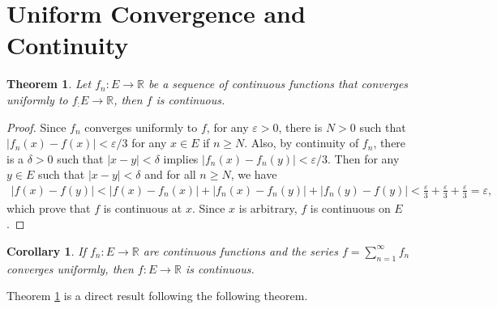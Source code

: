 \documentclass[11pt]{book}
\newtheorem{theorem}{Theorem}[chapter]
\newtheorem{corollary}{Corollary}[theorem]
\theoremstyle{definition}
\numberwithin{equation}{chapter}
\begin{document}
\medskip







\section{Uniform Convergence and Continuity}

\begin{theorem}\label{th_63}
Let $f_n: E \to \mathbb{R}$ be a sequence of continuous functions that converges uniformly to $f_: E \to \mathbb{R}$, then $f$ is continuous.
\end{theorem}
\begin{proof}
Since $f_n$ converges uniformly to $f$, for any $\varepsilon > 0$, there is $N > 0$ such that $\left|f_n(x) - f(x)\right| < \varepsilon/3$ for any $x \in E$ if $n \geq N$. Also, by continuity of $f_n$, there is a $\delta > 0$ such that $\left|x - y\right| < \delta$ implies $\left|f_n(x) - f_n(y)\right| < \varepsilon/3$. Then for any $y \in E$ such that $\left|x - y\right| < \delta$ and for all $n \geq N$, we have
\begin{align*}
    \left|f(x) - f(y)\right| < \left|f(x) - f_n(x)\right| + \left|f_n(x) - f_n(y)\right| + \left|f_n(y) - f(y)\right| < \frac{\varepsilon}{3} + \frac{\varepsilon}{3} + \frac{\varepsilon}{3} = \varepsilon,
\end{align*}
which prove that $f$ is continuous at $x$. Since $x$ is arbitrary, $f$ is continuous on $E$.
\end{proof}

\medskip


\begin{corollary}\label{coro_631}
If $f_n: E \to \mathbb{R}$ are continuous functions and the series $f = \sum^\infty_{n=1} f_n$ converges uniformly, then $f: E \to \mathbb{R}$ is continuous.
\end{corollary}

\medskip

Theorem \ref{th_63} is a direct result following the following theorem.

\medskip
\end{document}
